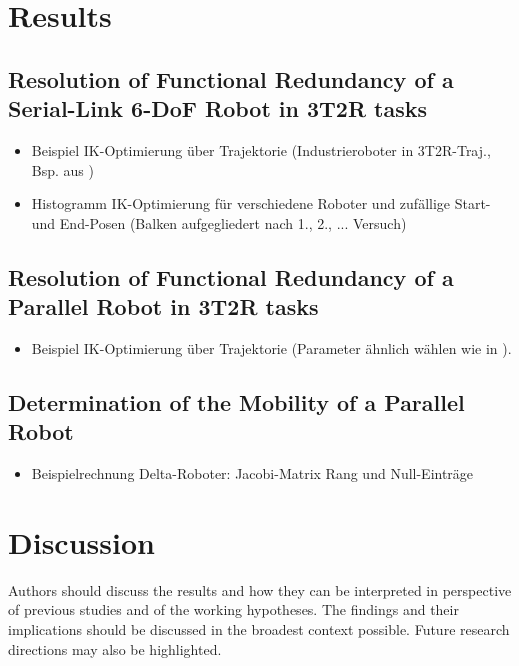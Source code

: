 \documentclass[robotics,article,submit,moreauthors,pdftex]{Definitions/mdpi}
\begin{document}
\section{Results}
\label{sec:Ergebnisse}


\subsection{Resolution of Functional Redundancy of a Serial-Link 6-DoF Robot in 3T2R tasks}

\color{gray}
\begin{itemize}
    \item Beispiel IK-Optimierung über Trajektorie (Industrieroboter in 3T2R-Traj., Bsp. aus \cite{HuoBar2008,HuoBar2011})
    \item Histogramm IK-Optimierung für verschiedene Roboter und zufällige Start- und End-Posen (Balken aufgegliedert nach 1., 2., ... Versuch)
\end{itemize}
\color{black}

\subsection{Resolution of Functional Redundancy of a Parallel Robot in 3T2R tasks}

\color{gray}
\begin{itemize}
    \item Beispiel IK-Optimierung über Trajektorie (Parameter ähnlich wählen wie in \cite{MerletPerDan2000}).
\end{itemize}
\color{black}

\subsection{Determination of the Mobility of a Parallel Robot}

\color{gray}
\begin{itemize}
    \item Beispielrechnung Delta-Roboter: Jacobi-Matrix Rang und Null-Einträge
\end{itemize}
\color{black}

\section{Discussion}

Authors should discuss the results and how they can be interpreted in perspective of previous studies and of the working hypotheses. The findings and their implications should be discussed in the broadest context possible. Future research directions may also be highlighted.
\end{document}
